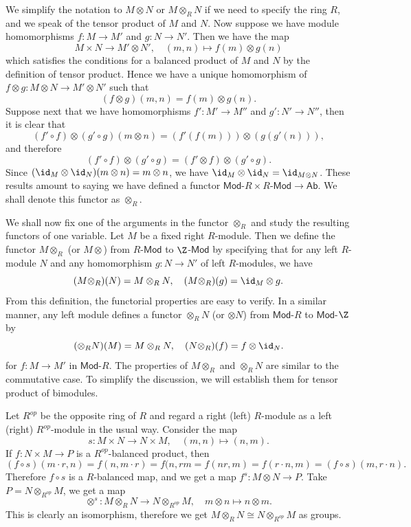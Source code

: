 We simplify the notation to $M\otimes N$ or $M\otimes_RN$ if we need to specify the ring $R$, and we speak of the tensor product of $M$ and $N$. Now suppose we have module homomorphisms $f:M\to M'$ and $g:N\to N'$. Then we have the map
\[M\times N\to M'\otimes N',\quad (m,n)\mapsto f(m)\otimes g(n)\]
which satisfies the conditions for a balanced product of $M$ and $N$ by the definition of tensor product. Hence we have a unique homomorphism of $f\otimes g:M\otimes N\to M'\otimes N'$ such that
\[(f\otimes g)(m,n)=f(m)\otimes g(n).\]
Suppose next that we have homomorphisms $f':M'\to M''$ and $g':N'\to N''$, then it is clear that
\[(f'\circ f)\otimes(g'\circ g)(m\otimes n)=(f'(f(m)))\otimes(g(g'(n))),\]
and therefore
\[(f'\circ f)\otimes(g'\circ g)=(f'\otimes f)\otimes(g'\circ g).\]
Since $(\id_M\otimes\id_N)(m\otimes n)=m\otimes n$, we have $\id_M\otimes\id_N=\id_{M\otimes N}$. These results amount to saying we have defined a functor $\mathsf{Mod}\text{-$R$}\times\text{$R$-}\mathsf{Mod}\to\mathsf{Ab}$. We shall denote this functor as $\otimes_R$.\par
We shall now fix one of the arguments in the functor $\otimes_R$ and study the resulting functors of one variable. Let $M$ be a fixed right $R$-module. Then we define the functor $M\otimes_R$ (or $M\otimes$) from $R$-$\mathsf{Mod}$ to $\Z$-$\mathsf{Mod}$ by specifying that for any left $R$-module $N$ and any homomorphism $g:N\to N'$ of left $R$-modules, we have
\[(M\otimes_R)(N)=M\otimes_RN,\quad (M\otimes_R)(g)=\id_M\otimes g.\]
From this definition, the functorial properties are easy to verify. In a similar manner, any left module defines a functor $\otimes_RN$ (or $\otimes N$) from $\mathsf{Mod}$-$R$ to $\mathsf{Mod}$-$\Z$ by
\[(\otimes_RN)(M)=M\otimes_RN,\quad (N\otimes_R)(f)=f\otimes\id_N.\]
for $f:M\to M'$ in $\mathsf{Mod}$-$R$. The properties of $M\otimes_R$ and $\otimes_RN$ are similar to the commutative case. To simplify the discussion, we will establish them for tensor product of bimodules.
\begin{example}
Let $R^{op}$ be the opposite ring of $R$ and regard a right (left) $R$-module as a left (right) $R^{op}$-module in the usual way. Consider the map
\[s:M\times N\to N\times M,\quad (m,n)\mapsto(n,m).\]
If $f:N\times M\to P$ is a $R^{op}$-balanced product, then
\[(f\circ s)(m\cdot r,n)=f(n,m\cdot r)=f(n,rm=f(nr,m)=f(r\cdot n,m)=(f\circ s)(m,r\cdot n).\]
Therefore $f\circ s$ is a $R$-balanced map, and we get a map $f^s:M\otimes N\to P$. Take $P=N\otimes_{R^{op}}M$, we get a map
\[\otimes^s:M\otimes_{R}N\to N\otimes_{R^{op}}M,\quad m\otimes n\mapsto n\otimes m.\]
This is clearly an isomorphism, therefore we get $M\otimes_{R}N\cong N\otimes_{R^{op}}M$ as groups.
\end{example}
